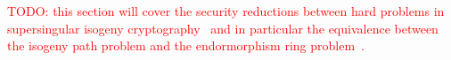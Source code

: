 \documentclass[10pt]{article}
\theoremstyle{plain}
\theoremstyle{definition}
\newtheorem{problem}{Problem}
\begin{document}
\textcolor{red}{TODO: this section will cover the security reductions
  between hard problems in supersingular isogeny
  cryptography~\cite{EC:Wesolowski22} and in particular the
  equivalence between the isogeny path problem and the endormorphism
  ring problem~\cite{FOCS:Wesolowski21}.}









\end{document}
